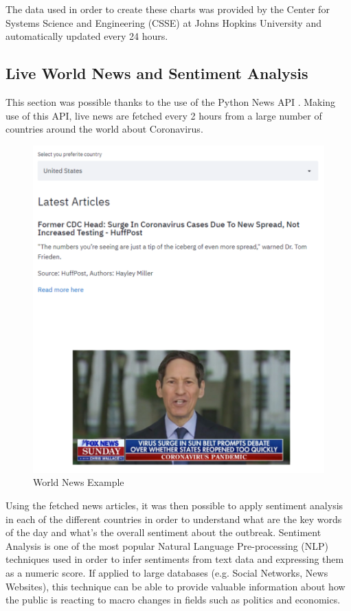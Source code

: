 The data used in order to create these charts was provided by the Center for Systems Science and Engineering (CSSE) at Johns Hopkins University \cite{world_data} and automatically updated every 24 hours.

\subsection{Live World News and Sentiment Analysis}

This section was possible thanks to the use of the Python News API \cite{news}. Making use of this API, live news are fetched every 2 hours from a large number of countries around the world about Coronavirus. 

\begin{figure}[ht!]%
    \centering
    \includegraphics[width=0.8\linewidth]{latex/images/news.pdf}
    \caption{World News Example}
    \label{news}
\end{figure}

Using the fetched news articles, it was then possible to apply sentiment analysis in each of the different countries in order to understand what are the key words of the day and what's the overall sentiment about the outbreak. Sentiment Analysis is one of the most popular Natural Language Pre-processing (NLP) techniques used in order to infer sentiments from text data and expressing them as a numeric score. If applied to large databases (e.g. Social Networks, News Websites), this technique can be able to provide valuable information about how the public is reacting to macro changes in fields such as politics and economics.

